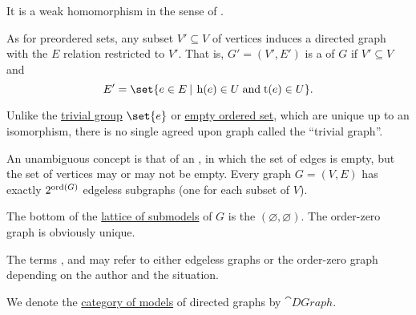 \begin{definition}
\begin{thmenum}[resume=def:directed_graph]
    It is a weak homomorphism in the sense of .

     As for preordered sets, any subset \( V' \subseteq V \) of vertices induces a directed graph with the \( E \) relation restricted to \( V' \). That is, \( G' = (V', E') \) is a  of \( G \) if \( V' \subseteq V \) and
    \begin{equation*}
      E' = \set{ e \in E \given \head(e) \in U \T{and} \tail(e) \in U }.
    \end{equation*}

     Unlike the \hyperref[def:group/trivial]{trivial group} \( \set{ e } \) or \hyperref[def:partially_ordered_set/trivial]{empty ordered set}, which are unique up to an isomorphism, there is no single agreed upon graph called the \enquote{trivial graph}.

    An unambiguous concept is that of an , in which the set of edges is empty, but the set of vertices may or may not be empty. Every graph \( G = (V, E) \) has exactly \( 2^{\operatorname{ord}(G)} \) edgeless subgraphs (one for each subset of \( V \)).

    The bottom of the \hyperref[thm:substructures_form_complete_lattice]{lattice of submodels} of \( G \) is the  \( (\varnothing, \varnothing) \). The order-zero graph is obviously unique.

    The terms ,  and  may refer to either edgeless graphs or the order-zero graph depending on the author and the situation.

     We denote the \hyperref[def:category_of_first_order_models]{category of models} of directed graphs by \( \cat{DGraph} \).
  \end{thmenum}
\end{definition}

